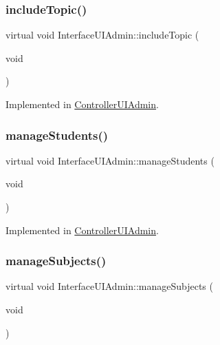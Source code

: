 \subsubsection{\texorpdfstring{include\+Topic()}{includeTopic()}}
{\footnotesize\ttfamily virtual void Interface\+U\+I\+Admin\+::include\+Topic (\begin{DoxyParamCaption}\item[{void}]{ }\end{DoxyParamCaption})\hspace{0.3cm}{\ttfamily [pure virtual]}}



Implemented in \hyperlink{class_controller_u_i_admin_adb83b8e77cde718af7571e4d256b6b63}{Controller\+U\+I\+Admin}.

\mbox{\label{class_interface_u_i_admin_a4cfdde0e6b96ced849e26c75c7de2077}} 
\subsubsection{\texorpdfstring{manage\+Students()}{manageStudents()}}
{\footnotesize\ttfamily virtual void Interface\+U\+I\+Admin\+::manage\+Students (\begin{DoxyParamCaption}\item[{void}]{ }\end{DoxyParamCaption})\hspace{0.3cm}{\ttfamily [pure virtual]}}



Implemented in \hyperlink{class_controller_u_i_admin_ad77ca0f143bc938b48198d91b1be031b}{Controller\+U\+I\+Admin}.

\mbox{\label{class_interface_u_i_admin_ac5c6b8b3eb80b5f5d401b711da4ecc58}} 
\subsubsection{\texorpdfstring{manage\+Subjects()}{manageSubjects()}}
{\footnotesize\ttfamily virtual void Interface\+U\+I\+Admin\+::manage\+Subjects (\begin{DoxyParamCaption}\item[{void}]{ }\end{DoxyParamCaption})\hspace{0.3cm}{\ttfamily [pure virtual]}}




